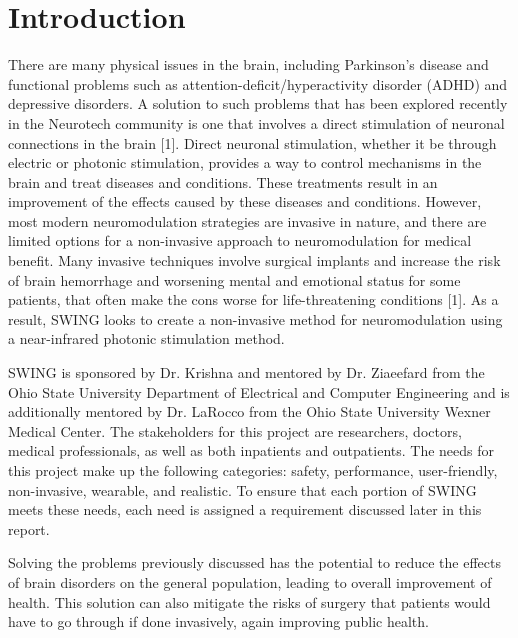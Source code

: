 \documentclass[journal,twoside,web]{ieeecolor}
\begin{document}
\begin{IEEEkeywords}

\end{IEEEkeywords}

\section{Introduction}
\label{sec:introduction}
There are many physical issues in the brain, including Parkinson's disease and functional problems such as attention-deficit/hyperactivity disorder (ADHD) 
and depressive disorders. A solution to such problems that has been explored recently in the Neurotech community is one that involves a direct stimulation of 
neuronal connections in the brain [1]. Direct neuronal stimulation, whether it be through electric or photonic stimulation, provides a way to control 
mechanisms in the brain and treat diseases and conditions. These treatments result in an improvement of the effects caused by these diseases and conditions. 
However, most modern neuromodulation strategies are invasive in nature, and there are limited options for a non-invasive approach to neuromodulation for medical benefit. 
Many invasive techniques involve surgical implants and increase the risk of brain hemorrhage and worsening mental and emotional status for some patients, 
that often make the cons worse for life-threatening conditions [1]. As a result, SWING looks to create a non-invasive method for neuromodulation 
using a near-infrared photonic stimulation method.

SWING is sponsored by Dr. Krishna and mentored by Dr. Ziaeefard from the Ohio State University Department of Electrical and Computer Engineering and is additionally mentored by 
Dr. LaRocco from the Ohio State University Wexner Medical Center. The stakeholders for this project are researchers, doctors, medical professionals, 
as well as both inpatients and outpatients. The needs for this project make up the following categories: safety, performance, user-friendly, non-invasive, wearable, and realistic. 
To ensure that each portion of SWING meets these needs, each need is assigned a requirement discussed later in this report.

Solving the problems previously discussed has the potential to reduce the effects of brain disorders on the general population, leading to overall improvement of health. 
This solution can also mitigate the risks of surgery that patients would have to go through if done invasively, again improving public health.
\end{document}
